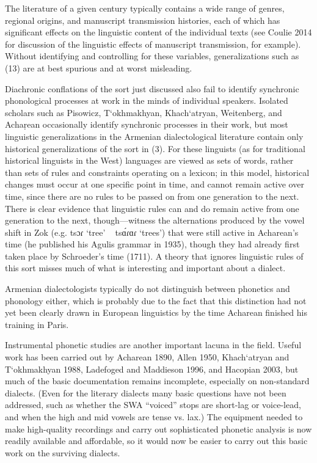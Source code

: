 The literature of a given century typically contains a wide range of genres, regional origins, and manuscript transmission histories, each of which has significant effects on the linguistic content of the individual texts (see Coulie 2014 for discussion of the linguistic effects of manuscript transmission, for example). Without identifying and controlling for these variables,  generalizations such as (13) are at best spurious and at worst misleading.

Diachronic conflations of the sort just discussed also fail to identify synchronic phonological processes at work in the minds of individual speakers. Isolated scholars such as Pisowicz, T‘okhmakhyan, Khach‘atryan, Weitenberg, and Achaṛean occasionally identify synchronic processes in their work, but most linguistic generalizations in the Armenian dialectological literature contain only historical generalizations of the sort in (3). For these linguists (as for traditional historical linguists in the West) languages are viewed as sets of words, rather than sets of rules and constraints operating on a lexicon; in this model, historical changes must occur at one specific point in time, and cannot remain active over time, since there are no rules to be passed on from one generation to the next. There is clear evidence that linguistic rules can and do remain active from one generation to the next, though—witness the alternations produced by the vowel shift in Zok (e.g. tsɔɾ ‘tree’ ~ tsɑ́ɾɑɾ ‘trees’) that were still active in Acharean’s time (he published his Agulis grammar in 1935), though they had already first taken place by Schroeder’s time (1711). A theory that ignores linguistic rules of this sort misses much of what is interesting and important about a dialect.

Armenian dialectologists typically do not distinguish between phonetics and phonology either, which is probably due to the fact that this distinction had not yet been clearly drawn in European linguistics by the time Acharean finished his training in Paris.

Instrumental phonetic studies are another important lacuna in the field. Useful work has been carried out by Acharean 1890, Allen 1950, Khach‘atryan and T‘okhmakhyan 1988, Ladefoged and Maddieson 1996, and Hacopian 2003, but much of the basic documentation remains incomplete, especially on non-standard dialects. (Even for the literary dialects many basic questions have not been addressed, such as whether the SWA “voiced” stops are short-lag or voice-lead, and when the high and mid vowels are tense vs. lax.) The equipment needed to make high-quality recordings and carry out sophisticated phonetic analysis is now readily available and affordable, so it would now be easier to carry out this basic work on the surviving dialects.

